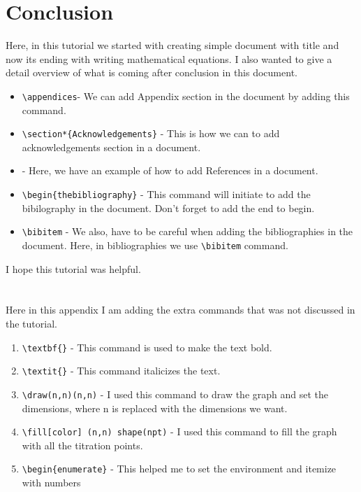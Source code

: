 \documentclass[12pt,journal,compsoc]{IEEEtran}
\begin{document}
\section{Conclusion}
Here, in this tutorial we started with creating simple document with title and now its ending with writing mathematical equations. I also wanted to give a detail overview of what is coming after conclusion in this document.
\begin{itemize}
    \item \verb|\appendices|- We can add Appendix section in the document by adding this command.
    \item \verb|\section*{Acknowledgements}| - This is how we can to add acknowledgements section in a document. 
    \item - Here, we have an example of how to add References in a document.
    \item \verb|\begin{thebibliography}| - This command will initiate to add the bibilography in the document. Don't forget to add the end to begin.
    \item \verb|\bibitem| - We also, have to be careful when adding the bibliographies in the document. Here, in bibliographies we use \verb|\bibitem| command.
\end{itemize}
I hope this tutorial was helpful.

\appendices
\section{}

Here in this appendix I am adding the extra commands that was not discussed in the tutorial.
\begin{enumerate}
    \item \verb|\textbf{}| - This command is used to make the text bold.
    \item \verb|\textit{}| - This command italicizes the text.
    \item \verb|\draw(n,n)(n,n)| - I used this command to draw the graph and set the dimensions, where n is replaced with the dimensions we want.
    \item \verb|\fill[color] (n,n) shape(npt)| - I used this command to fill the graph with all the titration points.
    \item \verb|\begin{enumerate}| - This helped me to set the environment and itemize with numbers
\end{enumerate}
\end{document}
